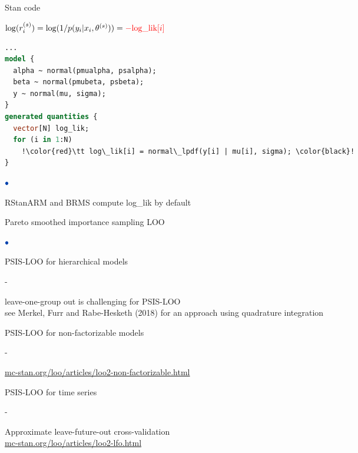 \documentclass[english,t]{beamer}
\newenvironment{list1}{
   \begin{list}{$\color{list1}\bullet$}{\itemsep=6pt}}{
  \end{list}}
\newenvironment{list2}{
  \begin{list}{-}{\baselineskip=12pt\itemsep=2pt}}{
  \end{list}}
\begin{document}

\begin{frame}[fragile]

  {\Large\color{navyblue} Stan code }

  \vspace{\baselineskip}
  $ \log(r_i^{(s)}) = \log(1/p(y_i|x_i,\theta^{(s)})) = {\color{red}-\mbox{log\_lik}[i]}$
  \vspace{\baselineskip}

  \pause
  {\small
\begin{lstlisting}[language=Stan,escapechar=!]
...
model {
  alpha ~ normal(pmualpha, psalpha);
  beta ~ normal(pmubeta, psbeta);
  y ~ normal(mu, sigma);
}
generated quantities {
  vector[N] log_lik;
  for (i in 1:N)
    !\color{red}\tt log\_lik[i] = normal\_lpdf(y[i] | mu[i], sigma); \color{black}!
}
\end{lstlisting}
  }

  \begin{list1}
  \item<3-> RStanARM and BRMS compute log\_lik by default
  \end{list1}
  
\end{frame}

\begin{frame}{}
  
{\Large\color{navyblue} Pareto smoothed importance sampling LOO}

\begin{list1}
\item PSIS-LOO for hierarchical models
  \begin{list2}
  \item leave-one-group out is challenging for PSIS-LOO\\ \vspace{0.2\baselineskip}
    {\small see Merkel, Furr and Rabe-Hesketh
      (2018) for an approach using quadrature integration}
  \end{list2}
  \item<2-> PSIS-LOO for non-factorizable models
    \begin{list2}
    \item {\url{mc-stan.org/loo/articles/loo2-non-factorizable.html}}
    \end{list2}
  \item<3-> PSIS-LOO for time series
  \begin{list2}
  \item Approximate leave-future-out cross-validation \\ \vspace{0.2\baselineskip}
    {\url{mc-stan.org/loo/articles/loo2-lfo.html}}
  \end{list2}
\end{list1}

\end{frame}
\end{document}
